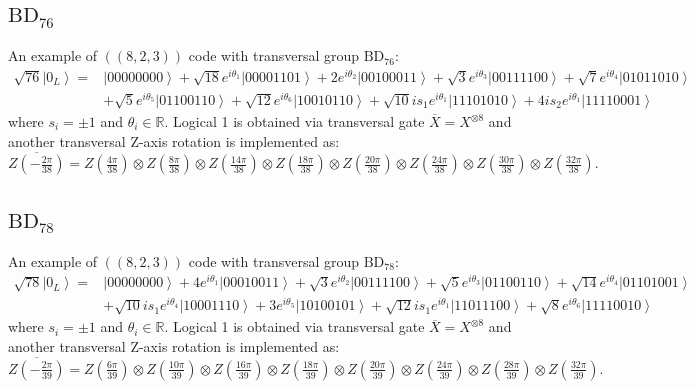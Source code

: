 \documentclass[8pt]{article}
\theoremstyle{definition}
\begin{document}
\subsection{\texorpdfstring{$\mathrm{BD}_{76}$}{BD₇₆}}

An example of $((8,2,3))$ code with transversal group $\mathrm{BD}_{76}$:
\begin{align*}
    \sqrt{76}\left|0_{L}\right\rangle = & \left|00000000\right\rangle +\sqrt{18}e^{i\theta_{1}}\left|00001101\right\rangle +2e^{i\theta_{2}}\left|00100011\right\rangle +\sqrt{3}e^{i\theta_{3}}\left|00111100\right\rangle +\sqrt{7}e^{i\theta_{4}}\left|01011010\right\rangle \\&+\sqrt{5}e^{i\theta_{5}}\left|01100110\right\rangle +\sqrt{12}e^{i\theta_{6}}\left|10010110\right\rangle +\sqrt{10}is_{1}e^{i\theta_{1}}\left|11101010\right\rangle +4is_{2}e^{i\theta_{1}}\left|11110001\right\rangle
\end{align*}
where $s_i=\pm 1$ and $\theta_i\in\mathbb{R}$. Logical 1 is obtained via transversal gate $\overline{X}=X^{\otimes 8}$ and another transversal Z-axis rotation is implemented as:
\[ \overline{Z\left(-\tfrac{2\pi}{38}\right)}=Z\left(\tfrac{4\pi}{38}\right)\otimes Z\left(\tfrac{8\pi}{38}\right)\otimes Z\left(\tfrac{14\pi}{38}\right)\otimes Z\left(\tfrac{18\pi}{38}\right)\otimes Z\left(\tfrac{20\pi}{38}\right)\otimes Z\left(\tfrac{24\pi}{38}\right)\otimes Z\left(\tfrac{30\pi}{38}\right)\otimes Z\left(\tfrac{32\pi}{38}\right).\]

\subsection{\texorpdfstring{$\mathrm{BD}_{78}$}{BD₇₈}}

An example of $((8,2,3))$ code with transversal group $\mathrm{BD}_{78}$:
\begin{align*}
    \sqrt{78}\left|0_{L}\right\rangle = & \left|00000000\right\rangle +4e^{i\theta_{1}}\left|00010011\right\rangle +\sqrt{3}e^{i\theta_{2}}\left|00111100\right\rangle +\sqrt{5}e^{i\theta_{3}}\left|01100110\right\rangle +\sqrt{14}e^{i\theta_{4}}\left|01101001\right\rangle \\&+\sqrt{10}is_{1}e^{i\theta_{4}}\left|10001110\right\rangle +3e^{i\theta_{5}}\left|10100101\right\rangle +\sqrt{12}is_{1}e^{i\theta_{1}}\left|11011100\right\rangle +\sqrt{8}e^{i\theta_{6}}\left|11110010\right\rangle
\end{align*}
where $s_i=\pm 1$ and $\theta_i\in\mathbb{R}$. Logical 1 is obtained via transversal gate $\overline{X}=X^{\otimes 8}$ and another transversal Z-axis rotation is implemented as:
\[ \overline{Z\left(-\tfrac{2\pi}{39}\right)}=Z\left(\tfrac{6\pi}{39}\right)\otimes Z\left(\tfrac{10\pi}{39}\right)\otimes Z\left(\tfrac{16\pi}{39}\right)\otimes Z\left(\tfrac{18\pi}{39}\right)\otimes Z\left(\tfrac{20\pi}{39}\right)\otimes Z\left(\tfrac{24\pi}{39}\right)\otimes Z\left(\tfrac{28\pi}{39}\right)\otimes Z\left(\tfrac{32\pi}{39}\right). \]
\end{document}
